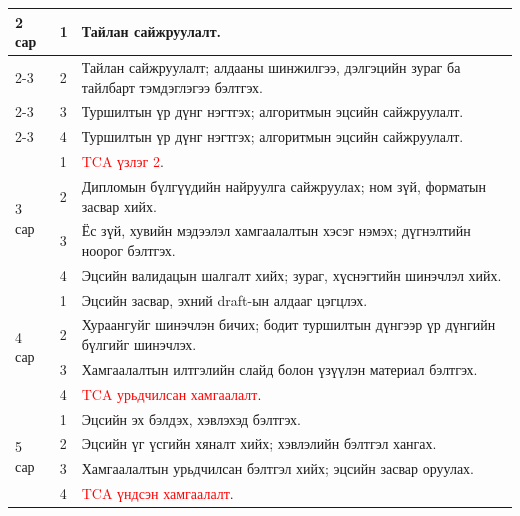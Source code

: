 \begin{longtable}{|p{2.2cm}|p{2cm}|p{10.5cm}|}
\multirow{4}{*}{2 сар} & 1 & Тайлан сайжруулалт. \\
\cline{2-3}
& 2 & Тайлан сайжруулалт; алдааны шинжилгээ, дэлгэцийн зураг ба тайлбарт тэмдэглэгээ бэлтгэх. \\
\cline{2-3}
& 3 & Туршилтын үр дүнг нэгтгэх; алгоритмын эцсийн сайжруулалт. \\
\cline{2-3}
& 4 & Туршилтын үр дүнг нэгтгэх; алгоритмын эцсийн сайжруулалт. \\
\hline

\multirow{4}{*}{3 сар} & 1 & \textcolor{red}{TCA үзлэг 2}. \\
\cline{2-3}
& 2 & Дипломын бүлгүүдийн найруулга сайжруулах; ном зүй, форматын засвар хийх. \\
\cline{2-3}
& 3 & Ёс зүй, хувийн мэдээлэл хамгаалалтын хэсэг нэмэх; дүгнэлтийн ноорог бэлтгэх. \\
\cline{2-3}
& 4 & Эцсийн валидацын шалгалт хийх; зураг, хүснэгтийн шинэчлэл хийх. \\
\hline

\multirow{4}{*}{4 сар} & 1 & Эцсийн засвар, эхний draft-ын алдааг цэгцлэх. \\
\cline{2-3}
& 2 & Хураангуйг шинэчлэн бичих; бодит туршилтын дүнгээр үр дүнгийн бүлгийг шинэчлэх. \\
\cline{2-3}
& 3 & Хамгаалалтын илтгэлийн слайд болон үзүүлэн материал бэлтгэх. \\
\cline{2-3}
& 4 & \textcolor{red}{TCA урьдчилсан хамгаалалт}. \\
\hline

\multirow{4}{*}{5 сар} & 1 & Эцсийн эх бэлдэх, хэвлэхэд бэлтгэх. \\
\cline{2-3}
& 2 & Эцсийн үг үсгийн хяналт хийх; хэвлэлийн бэлтгэл хангах. \\
\cline{2-3}
& 3 & Хамгаалалтын урьдчилсан бэлтгэл хийх; эцсийн засвар оруулах. \\
\cline{2-3}
& 4 & \textcolor{red}{TCA үндсэн хамгаалалт}. \\
\hline
\end{longtable}


